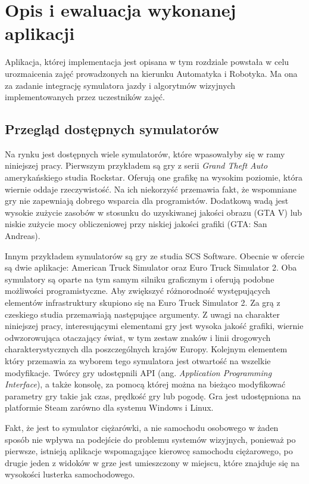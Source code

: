 \chapter{Opis i ewaluacja wykonanej aplikacji}


Aplikacja, której implementacja jest opisana w tym rozdziale powstała w celu urozmaicenia zajęć prowadzonych na kierunku Automatyka i Robotyka. 
Ma ona za zadanie integrację symulatora jazdy i algorytmów wizyjnych implementowanych przez uczestników zajęć. 

\section{Przegląd dostępnych symulatorów}
\label{sec:ets2}

Na rynku jest dostępnych wiele symulatorów, które wpasowałyby się w ramy niniejszej pracy.
Pierwszym przykładem są gry z serii \textit{Grand Theft Auto} amerykańskiego studia Rockstar. 
Oferują one grafikę na wysokim poziomie, która wiernie oddaje rzeczywistość. 
Na ich niekorzyść przemawia fakt, że wspomniane gry nie zapewniają dobrego wsparcia dla programistów. 
Dodatkową wadą jest wysokie zużycie zasobów w stosunku do uzyskiwanej jakości obrazu (GTA V) lub niskie zużycie mocy obliczeniowej przy niskiej jakości grafiki (GTA: San Andreas).

Innym przykładem symulatorów są gry ze studia SCS Software. 
Obecnie w ofercie są dwie aplikacje: American Truck Simulator oraz Euro Truck Simulator 2. 
Oba symulatory są oparte na tym samym silniku graficznym i oferują podobne możliwości programistyczne. 
Aby zwiększyć różnorodność występujących elementów infrastruktury skupiono się na Euro Truck Simulator 2.
Za grą z czeskiego studia przemawiają następujące argumenty. 
Z uwagi na charakter niniejszej pracy, interesującymi elementami gry jest wysoka jakość grafiki, wiernie odwzorowująca otaczający świat, w tym zestaw znaków i linii drogowych charakterystycznych dla poszczególnych krajów Europy. 
Kolejnym elementem który przemawia za wyborem tego symulatora jest otwartość na wszelkie modyfikacje. 
Twórcy gry udostępnili API (ang. \textit{Application Programming Interface}), a także konsolę, za pomocą której można na bieżąco modyfikować parametry gry takie jak czas, prędkość gry lub pogodę.
Gra jest udostępniona na platformie Steam zarówno dla systemu Windows i Linux.

Fakt, że jest to symulator ciężarówki, a nie samochodu osobowego w żaden sposób nie wpływa na podejście do problemu systemów wizyjnych, ponieważ po pierwsze, istnieją aplikacje wspomagające kierowcę samochodu ciężarowego, po drugie jeden z widoków w grze jest umieszczony w miejscu, które znajduje się na wysokości lusterka samochodowego.


